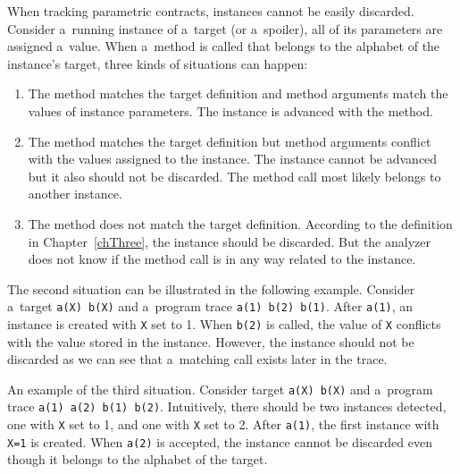 When tracking parametric contracts, instances cannot be easily discarded.
Consider a~running instance of a~target (or a~spoiler), all of its parameters
are assigned a~value. When a~method is called that belongs to the alphabet of
the instance's target, three kinds of situations can happen:
\begin{enumerate}
    \item The method matches the target definition and method arguments match
        the values of instance parameters. The instance is advanced with the
        method.
    \item The method matches the target definition but method arguments conflict
        with the values assigned to the instance. The instance cannot be
        advanced but it also should not be discarded. The method call most
        likely belongs to another instance.
    \item The method does not match the target definition. According to the
        definition in Chapter~\ref{chThree}, the instance should be discarded.
        But the analyzer does not know if the method call is in any way related
        to the instance.
\end{enumerate}

The second situation can be illustrated in the following example. Consider
a~target \texttt{a(X) b(X)} and a~program trace \texttt{a(1) b(2) b(1)}. After
\texttt{a(1)}, an instance is created with \texttt{X} set to 1. When
\texttt{b(2)} is called, the value of \texttt{X} conflicts with the value stored
in the instance. However, the instance should not be discarded as we can see
that a~matching call exists later in the trace.

An example of the third situation. Consider target \texttt{a(X) b(X)} and
a~program trace \texttt{a(1) a(2) b(1) b(2)}. Intuitively, there should be two
instances detected, one with \texttt{X} set to 1, and one with \texttt{X} set to
2. After \texttt{a(1)}, the first instance with \texttt{X=1} is created. When
\texttt{a(2)} is accepted, the instance cannot be discarded even though it
belongs to the alphabet of the target.

